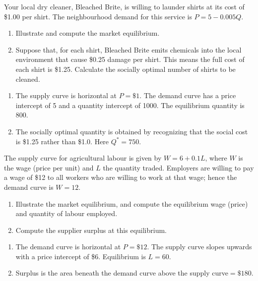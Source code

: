 \begin{enumialphparenastyle}
\begin{ex}\label{ex:ch5ex9}
Your local dry cleaner, Bleached Brite, is willing to launder shirts at its cost of \$1.00 per shirt. The neighbourhood demand for this service is $P=5-0.005Q$.
\begin{enumerate}
	\item	Illustrate and compute the market equilibrium.
	\item	Suppose that, for each shirt, Bleached Brite emits chemicals into the local environment that cause \$0.25 damage per shirt. This means the full cost of each shirt is \$1.25. Calculate the socially optimal number of shirts to be cleaned.
\end{enumerate}
\begin{sol}
\begin{enumerate}
	\item	The supply curve is horizontal at $P=\$1$. The demand curve has	a price intercept of 5 and a quantity intercept of 1000. The	equilibrium quantity is 800.
	\item	The socially optimal quantity is obtained by recognizing that the social cost is \$1.25 rather than \$1.0. Here $Q^*=750$.
\end{enumerate}
\end{sol}
\end{ex}

\begin{ex}\label{ex:ch5ex10}
The supply curve for agricultural labour is given by $W=6+0.1L$, where $W$ is the wage (price per unit) and $L$ the quantity traded. Employers are willing to pay a wage of \$12 to all workers who are willing to work at that wage; hence the demand curve is $W=12$.
\begin{enumerate}
	\item	Illustrate the market equilibrium, and compute the equilibrium wage (price) and quantity of labour employed.
	\item	Compute the supplier surplus at this equilibrium.
\end{enumerate}
\begin{sol}
\begin{enumerate}
	\item	The demand curve is horizontal at $P=\$12$. The supply curve slopes upwards with a price intercept of \$6. Equilibrium is $L=60$.
	\item	Surplus is the area beneath the demand curve above the supply curve$=\$180$.
\end{enumerate}
\end{sol}
\end{ex}


\end{enumialphparenastyle}
